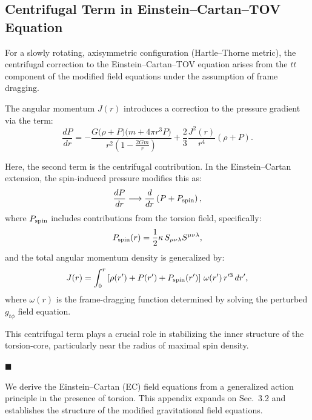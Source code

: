 \documentclass{article}
\begin{document}
\subsection*{ Centrifugal Term in Einstein–Cartan–TOV Equation}

For a slowly rotating, axisymmetric configuration (Hartle–Thorne metric), the centrifugal correction to the Einstein–Cartan–TOV equation arises from the $tt$ component of the modified field equations under the assumption of frame dragging.

The angular momentum $J(r)$ introduces a correction to the pressure gradient via the term:
\begin{equation}\label{eq:auto240}
\frac{dP}{dr} = -\frac{G \big( \rho + P \big)\big( m + 4\pi r^3 P \big)}{r^2 \left( 1 - \frac{2Gm}{r} \right)} + \frac{2}{3} \frac{J^2(r)}{r^4} \left( \rho + P \right).
\end{equation}

Here, the second term is the centrifugal contribution. In the Einstein–Cartan extension, the spin-induced pressure modifies this as:
\begin{equation}\label{eq:auto241}
\frac{dP}{dr} \longrightarrow \frac{d}{dr} \left( P + P_{\rm spin} \right),
\end{equation}
where $P_{\rm spin}$ includes contributions from the torsion field, specifically:
\begin{equation}\label{eq:auto242}
P_{\rm spin}(r) = \frac{1}{2} \kappa \, S_{\mu\nu\lambda} S^{\mu\nu\lambda},
\end{equation}
and the total angular momentum density is generalized by:
\begin{equation}\label{eq:auto243}
J(r) = \int_0^r \left[ \rho(r') + P(r') + P_{\rm spin}(r') \right] \, \omega(r') \, r'^3 \, dr',
\end{equation}
where $\omega(r)$ is the frame-dragging function determined by solving the perturbed $g_{t\phi}$ field equation.

This centrifugal term plays a crucial role in stabilizing the inner structure of the torsion-core, particularly near the radius of maximal spin density.

\hfill $\blacksquare$


\noindent
We derive the Einstein--Cartan (EC) field equations from a generalized action principle in the presence of torsion. This appendix expands on Sec.~3.2 and establishes the structure of the modified gravitational field equations.
\end{document}
